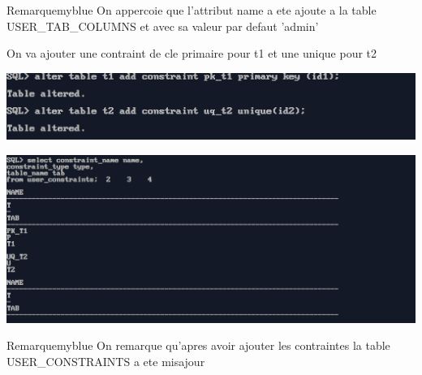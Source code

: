 \begin{prettyBox}{Remarque}{myblue}
On appercoie que l'attribut name a ete ajoute a la table USER\_TAB\_COLUMNS et avec sa valeur par defaut 'admin'
\end{prettyBox}

\vspace{0.25cm}
On va ajouter une contraint de cle primaire pour t1 et une unique pour t2


\begin{center}
    \includegraphics[width=\textwidth]{ScreenShot/Partie5/con.png}
\end{center}



\begin{center}
    \includegraphics[width=\textwidth]{ScreenShot/Partie5/testconst2.png}
\end{center}

\begin{prettyBox}{Remarque}{myblue}
On remarque qu'apres avoir ajouter les contraintes la table USER\_CONSTRAINTS a ete misajour
\end{prettyBox}





